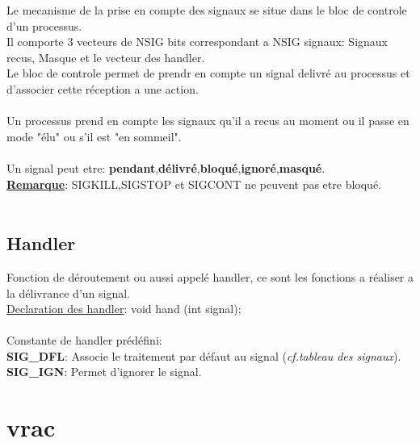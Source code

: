 \documentclass[a4paper,12pt,openany]{book}
\begin{document}
Le mecanisme de la prise en compte des signaux se situe dans le bloc de controle d'un processus.\\
Il comporte 3 vecteurs de NSIG bits correspondant a NSIG signaux: Signaux recus, Masque et le vecteur des handler.\\
Le bloc de controle permet de prendr en compte un signal delivré au processus et d'associer cette réception a une action.\\
\\
Un processus prend en compte les signaux qu'il a recus au moment ou il passe en mode "élu" ou s'il est "en sommeil".\\
\\
Un signal peut etre: \textbf{pendant},\textbf{délivré},\textbf{bloqué},\textbf{ignoré},\textbf{masqué}.\\
\underline{\textbf{Remarque}}: SIGKILL,SIGSTOP et SIGCONT ne peuvent pas etre bloqué.\\
\\

\subsection{Handler}

Fonction de déroutement ou aussi appelé handler, ce sont les fonctions a réaliser a la délivrance d'un signal.\\
\underline{Declaration des handler}: void hand (int signal); \\
\\
Constante de handler prédéfini:\\
\textbf{SIG_DFL}: Associe le traitement par défaut au signal (\emph{cf.tableau des signaux}).\\
\textbf{SIG_IGN}: Permet d'ignorer le signal.\\

\section{vrac}
\end{document}
